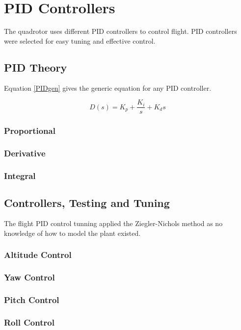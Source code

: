 \section{PID Controllers}


The quadrotor uses different PID controllers to control flight. PID controllers were selected for easy tuning and effective control. 

\subsection{PID Theory}
Equation \ref{PIDgen} gives the generic equation for any PID controller. 

\begin{equation}
D(s) = K_p+\frac{K_i}{s}+K_ds
\label{PIDgen}
\end{equation}

\subsubsection{Proportional}

\subsubsection{Derivative}

\subsubsection{Integral}

\subsection{Controllers, Testing and Tuning}

The flight  PID control tunning applied the Ziegler-Nichols method as no knowledge of how to model the plant existed.
\subsubsection{Altitude Control}
\subsubsection{Yaw Control}
\subsubsection{Pitch Control}
\subsubsection{Roll Control}